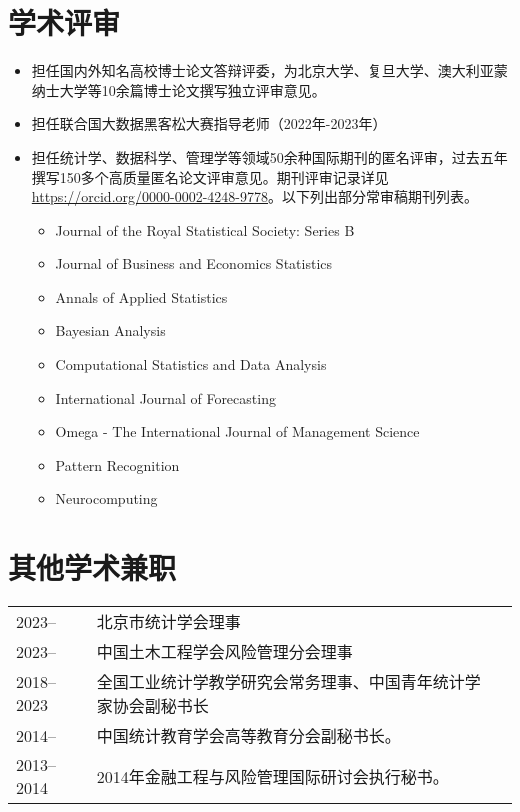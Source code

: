 \documentclass[twoside,a4paper,11pt]{article}
\begin{document}
\section{学术评审}

\begin{itemize}
\item   担任国内外知名高校博士论文答辩评委，为北京大学、复旦大学、澳大利亚蒙纳士大学等10余篇博士论文撰写独立评审意见。
\item   担任联合国大数据黑客松大赛指导老师（2022年-2023年）
\item   担任统计学、数据科学、管理学等领域50余种国际期刊的匿名评审，过去五年撰写150多个高质量匿名论文评审意见。期刊评审记录详见 \url{https://orcid.org/0000-0002-4248-9778}。以下列出部分常审稿期刊列表。
\begin{itemize}
\item Journal of the Royal Statistical Society: Series B
\item Journal of Business and Economics Statistics
\item Annals of Applied Statistics
\item Bayesian Analysis
\item Computational Statistics and Data Analysis
\item International Journal of Forecasting
\item Omega - The International Journal of Management Science
\item Pattern Recognition
\item Neurocomputing
\end{itemize}
\end{itemize}

\section{其他学术兼职}
\begin{tabular}{l p{} l}
  2023--     & 北京市统计学会理事                                               \\
  2023--     & 中国土木工程学会风险管理分会理事                               \\
  2018--2023 & 全国工业统计学教学研究会常务理事、中国青年统计学家协会副秘书长 \\
  2014--     & 中国统计教育学会高等教育分会副秘书长。                         \\
  2013--2014 & 2014年金融工程与风险管理国际研讨会执行秘书。                   \\
\end{tabular}
\end{document}

